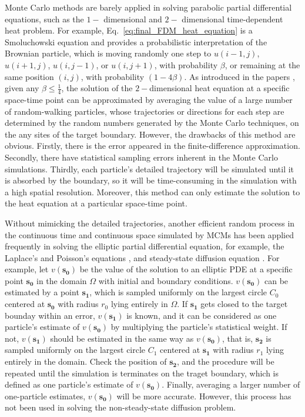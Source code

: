 Monte Carlo methods are barely applied in solving parabolic partial
differential equations, such as the $1-$ dimensional and $2-$
dimensional time-dependent heat problem. For example,
Eq.~\ref{eq:final_FDM_heat_equation} is a Smoluchowski equation
\cite{smoluchowski1916drei} and provides a probabilistic
interpretation of the Brownian particle, which is moving randomly one
step to $u(i-1, j)$, $u(i+1, j)$, $u(i, j-1)$, or $u(i, j+1)$, with
probability $\beta$, or remaining at the same position $(i, j)$, with
probability $(1-4\beta)$. As introduced in the papers
\cite{sadiku2006monte} \cite{gemjoz2017mcmheat}, given any $\beta \leq
\frac{1}{4}$, the solution of the $2-$dimensional heat equation at a
specific space-time point can be approximated by averaging the value
of a large number of random-walking particles, whose trajectories or
directions for each step are determined by the random numbers
generated by the Monte Carlo techniques, on the any sites of the
target boundary. However, the drawbacks of this method are
obvious. Firstly, there is the error appeared in the finite-difference
approximation. Secondly, there have statistical sampling errors
inherent in the Monte Carlo simulations. Thirdly, each particle's
detailed trajectory will be simulated until it is absorbed by the
boundary, so it will be time-consuming in the simulation with a high
spatial resolution. Moreover, this method can only estimate the
solution to the heat equation at a particular space-time point.


Without mimicking the detailed trajectories, another efficient random
process in the continuous time and continuous space simulated by MCMs
has been applied frequently in solving the elliptic partial
differential equation, for example, the Laplace’s and Poisson’s
equations \cite{haji1967application} \cite{booth1981exact}
\cite{muller1956some}, and steady-state diffusion equation
\cite{torquato1989efficient}. For example, let $v(\bm{s_0})$ be the
value of the solution to an elliptic PDE at a specific point
$\bm{s_0}$ in the domain $\Omega$ with initial and boundary
conditions. $v(\bm{s_0})$ can be estimated by a point $\bm{s_1}$,
which is sampled uniformly on the largest circle $C_0$ centered at
$\bm{s_0}$ with radius $r_0$ lying entirely in $\Omega$. If $\bm{s_1}$
gets closed to the target bounday within an error, $v(\bm{s_1})$ is
known, and it can be considered as one particle's estimate of
$v(\bm{s_0})$ by multiplying the particle’s statistical weight. If
not, $v(\bm{s_1})$ should be estimated in the same way as
$v(\bm{s_0})$, that is, $\bm{s_2}$ is sampled uniformly on the largest
circle $C_1$ centered at $\bm{s_1}$ with radius $r_1$ lying entirely
in the domain. Check the position of $\bm{s_2}$, and the procedure
will be repeated until the simulation is terminates on the traget
boundary, which is defined as one particle's estimate of
$v(\bm{s_0})$. Finally, averaging a larger number of one-particle
estimates, $v(\bm{s_0})$ will be more accurate. However, this process
has not been used in solving the non-steady-state diffusion problem.



    











